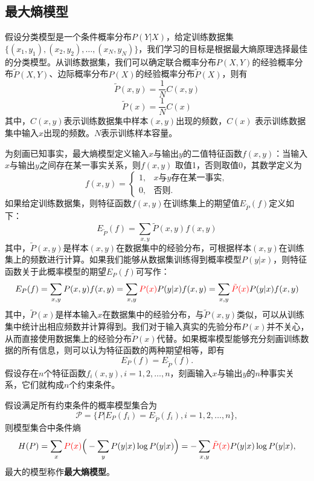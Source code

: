 \subsection{最大熵模型}
假设分类模型是一个条件概率分布$P(Y|X)$，给定训练数据集$\{(x_1, y_1),(x_2,y_2),\ldots, (x_N, y_N)\}$，我们学习的目标是根据最大熵原理选择最佳的分类模型。从训练数据集，我们可以确定联合概率分布$P(X,Y)$的经验概率分布$\tilde{P}(X,Y)$、边际概率分布$P(X)$的经验概率分布$\tilde{P}(X)$，则有
\[\tilde{P}(x,y) = \frac{1}{N}C(x, y)\]
\[\tilde{P}(x) = \frac{1}{N}C(x)\]
其中，$C(x, y)$表示训练数据集中样本$(x,y)$出现的频数，$C(x)$ 表示训练数据集中输入$x$出现的频数。$N$表示训练样本容量。

为刻画已知事实，最大熵模型定义输入$x$与输出$y$的二值特征函数$f(x,y)$：当输入$x$与输出$y$之间存在某一事实关系，则$f(x,y)$ 取值1，否则取值0，其数学定义为
\[f(x,y) = \left\{
\begin{array}{ll}
    1, & x\text{与}y\text{存在某一事实},\\
    0, & \text{否则}.
\end{array}
\right.\]
如果给定训练数据集，则特征函数$f(x,y)$在训练集上的期望值$E_{\tilde P}(f)$定义如下：
\[E_{\tilde P}(f)=\sum \limits_{x,y} \tilde P(x,y) f(x,y)\]
其中，$\tilde P(x,y)$是样本$(x,y)$在数据集中的经验分布，可根据样本$(x,y)$在训练集上的频数进行计算。如果我们能够从数据集训练得到概率模型$P(y|x)$，则特征函数关于此概率模型的期望$E_P(f)$可写作：
\[E_P(f) = \sum\limits_{x,y} P(x, y) f(x,y) = \sum\limits_{x,y} \textcolor{red}{P(x)} P(y|x) f(x,y) = \sum\limits_{x,y} \textcolor{red}{\tilde P(x)} P(y|x) f(x,y)\]
其中，$\tilde P(x)$是样本输入$x$在数据集中的经验分布，与$\tilde P(x,y)$类似，可以从训练集中统计出相应频数并计算得到。我们对于输入真实的先验分布$P(x)$并不关心，从而直接使用数据集上的经验分布$\tilde P(x)$代替。如果概率模型能够充分刻画训练数据的所有信息，则可以认为特征函数的两种期望相等，即有
\begin{equation}
    E_P(f) = E_{\tilde{P}}(f).
\end{equation}
假设存在$n$个特征函数$f_i(x,y),i=1,2,\ldots,n$，刻画输入$x$与输出$y$的$n$种事实关系，它们就构成$n$个约束条件。

\begin{definition}[最大熵模型]
假设满足所有约束条件的概率模型集合为
\begin{equation}
   \mathcal P = \{P| E_P(f_i) = E_{\tilde{P}}(f_i), i = 1,2,\ldots,n\},
\end{equation}
则模型集合中条件熵
\begin{equation}
    H(P) = \sum\limits_x \textcolor{red}{P(x)} \Big(-\sum\limits_y P(y|x) \log P(y|x)\Big) = -\sum\limits_{x,y} \textcolor{red}{\tilde{P}(x)} P(y|x) \log P(y|x),
\end{equation}
最大的模型称作\textbf{最大熵模型}。
\end{definition}

